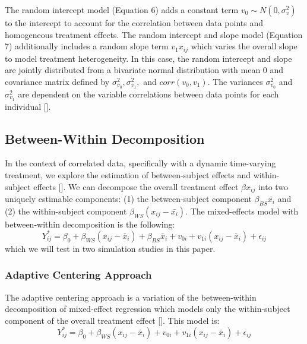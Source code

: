 \documentclass{article}
\begin{document}
    The random intercept model (Equation 6) adds a constant term $v_0 \sim N(0, \sigma^2_v)$ to the intercept to account for the correlation between data points and homogeneous treatment effects. The random intercept and slope model (Equation 7) additionally includes a random slope term $v_1x_{ij}$ which varies the overall slope to model treatment heterogeneity. In this case, the random intercept and slope are jointly distributed from a bivariate normal distribution with mean 0 and covariance matrix defined by $\sigma^2_{v_0}, \sigma^2_{v_1},$ and $corr(v_0, v_1)$. The variances $\sigma^2_{v_0}$ and $\sigma^2_{v_1}$ are dependent on the variable correlations between data points for each individual [\citealt{gibbons2006longitudinal}]. 
    
    \subsection{Between-Within Decomposition} 

    In the context of correlated data, specifically with a dynamic time-varying treatment, we explore the estimation of between-subject effects and within-subject effects [\citealt{10.2307/3109770}]. We can decompose the overall treatment effect $\beta x_{ij}$ into two uniquely estimable components: (1) the between-subject component $ \beta_{BS}\bar{x_i}$ and (2) the within-subject component $\beta_{WS}(x_{ij} - \bar{x_i})$. The mixed-effects model with between-within decomposition is the following: \begin{equation} Y_{ij}^* = \beta_0 + \beta_{WS}(x_{ij}-\bar{x}_i) + \beta_{BS}\bar{x}_i + v_{0i} + v_{1i}(x_{ij}-\bar{x}_i) + \epsilon_{ij} \end{equation} which we will test in two simulation studies in this paper. \\

    \subsubsection{Adaptive Centering Approach}
    \noindent The adaptive centering approach is a variation of the between-within decomposition of mixed-effect regression which models only the within-subject component of the overall treatment effect [\citealt{10.1162/edfp.2009.4.4.468}]. This model is: \begin{equation} Y_{ij}^* = \beta_0 + \beta_{WS}(x_{ij}-\bar{x}_i) + v_{0i} + v_{1i}(x_{ij}-\bar{x}_i) + \epsilon_{ij}\end{equation}
    
\end{document}
